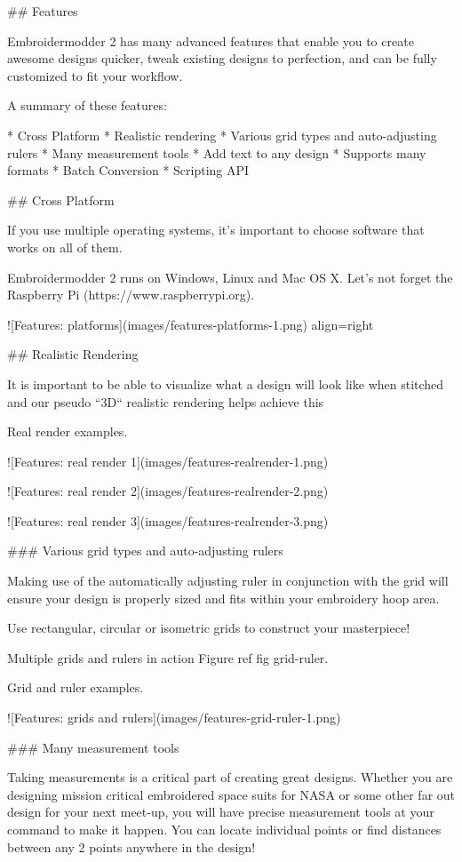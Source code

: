 ## Features

Embroidermodder 2 has many advanced features that enable you to create awesome designs quicker, tweak existing designs to perfection, and can be fully customized to fit your workflow.

A summary of these features:

* Cross Platform
* Realistic rendering
* Various grid types and auto-adjusting rulers
* Many measurement tools
* Add text to any design
* Supports many formats
* Batch Conversion
* Scripting API

## Cross Platform

If you use multiple operating systems, it's important to choose software that works on all of them.

Embroidermodder 2 runs on Windows, Linux and Mac OS X. Let's not forget the  Raspberry
Pi (https://www.raspberrypi.org).

![Features: platforms](images/features-platforms-1.png){ align=right }

## Realistic Rendering

It is important to be able to visualize what a design will look like when stitched and our
pseudo ``3D`` realistic rendering helps achieve this

Real render examples.

![Features: real render 1](images/features-realrender-1.png)

![Features: real render 2](images/features-realrender-2.png)

![Features: real render 3](images/features-realrender-3.png)

### Various grid types and auto-adjusting rulers

Making use of the automatically adjusting ruler in conjunction with the grid will ensure your
design is properly sized and fits within your embroidery hoop area.

Use rectangular, circular or isometric grids to construct your masterpiece!

Multiple grids and rulers in action Figure ref fig grid-ruler.

Grid and ruler examples.

![Features: grids and rulers](images/features-grid-ruler-1.png)

### Many measurement tools

Taking measurements is a critical part of creating great designs. Whether you are designing
mission critical embroidered space suits for NASA or some other far out design for your next
meet-up, you will have precise measurement tools at your command to make it happen. You can
locate individual points or find distances between any 2 points anywhere in the design!

